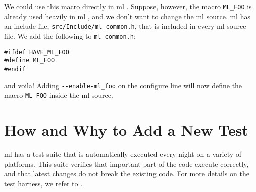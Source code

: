 \documentclass[10pt,letter,relax]{SANDreport}
\newcommand{\ML}     {{\sc ml }}
\begin{document}
We could use this macro directly in \ML.
Suppose, however, the macro \verb!ML_FOO! is already used
heavily in \ML, and we don't want to change the ml source.
\ML has an include file, \verb!src/Include/ml_common.h!, that is included in
every \ML source file.
We add the following to \verb!ml_common.h!:
\begin{verbatim}
#ifdef HAVE_ML_FOO
#define ML_FOO
#endif
\end{verbatim}
and voila!   Adding \verb!--enable-ml_foo! on the configure line will now define the
macro \verb!ML_FOO! inside the ml source.


\section{How and Why to Add a New Test}
\label{sec:add_test}

\ML has a test suite that is automatically
executed every night on a variety of platforms.
This suite verifies
that important part of the code execute correctly, and
that latest changes do not break the existing code.  For more details
on the test harness, we refer to \cite[Section 3.3]{Trilinos-Dev-Guide}.
\end{document}
